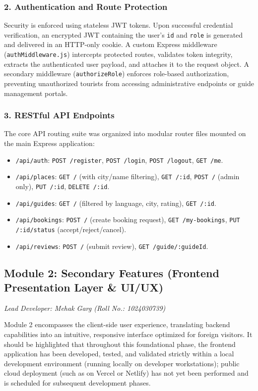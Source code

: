 \documentclass[12pt,a4paper,twoside,openright]{report}
\begin{document}
\subsubsection{2. Authentication and Route Protection}
Security is enforced using stateless JWT tokens. Upon successful credential verification, an encrypted JWT containing the user's \texttt{id} and \texttt{role} is generated and delivered in an HTTP-only cookie. A custom Express middleware (\texttt{authMiddleware.js}) intercepts protected routes, validates token integrity, extracts the authenticated user payload, and attaches it to the request object. A secondary middleware (\texttt{authorizeRole}) enforces role-based authorization, preventing unauthorized tourists from accessing administrative endpoints or guide management portals.

\subsubsection{3. RESTful API Endpoints}
The core API routing suite was organized into modular router files mounted on the main Express application:
\begin{itemize}[leftmargin=*]
    \item \texttt{/api/auth}: \texttt{POST /register}, \texttt{POST /login}, \texttt{POST /logout}, \texttt{GET /me}.
    \item \texttt{/api/places}: \texttt{GET /} (with city/name filtering), \texttt{GET /:id}, \texttt{POST /} (admin only), \texttt{PUT /:id}, \texttt{DELETE /:id}.
    \item \texttt{/api/guides}: \texttt{GET /} (filtered by language, city, rating), \texttt{GET /:id}.
    \item \texttt{/api/bookings}: \texttt{POST /} (create booking request), \texttt{GET /my-bookings}, \texttt{PUT /:id/status} (accept/reject/cancel).
    \item \texttt{/api/reviews}: \texttt{POST /} (submit review), \texttt{GET /guide/:guideId}.
\end{itemize}

\subsection{Module 2: Secondary Features (Frontend Presentation Layer \& UI/UX)}

\textit{Lead Developer: Mehak Garg (Roll No.: 1024030739)}

Module 2 encompasses the client-side user experience, translating backend capabilities into an intuitive, responsive interface optimized for foreign visitors. It should be highlighted that throughout this foundational phase, the frontend application has been developed, tested, and validated strictly within a local development environment (running locally on developer workstations); public cloud deployment (such as on Vercel or Netlify) has not yet been performed and is scheduled for subsequent development phases.
\end{document}
